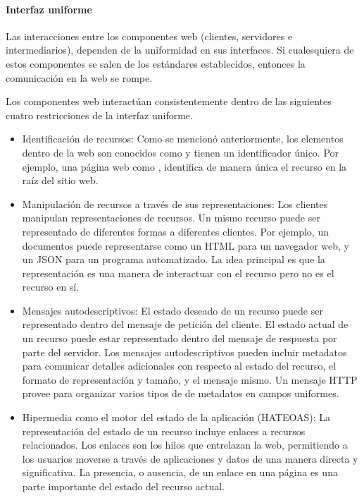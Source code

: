 \paragraph{Interfaz uniforme}
\label{\detokenize{chapter_one/rest:interfaz-uniforme}}
Las interacciones entre los componentes web (clientes, servidores e intermediarios),
dependen de la uniformidad en sus interfaces. Si cualesquiera de estos componentes se
salen de los estándares establecidos, entonces la comunicación en la web
se rompe.

Los componentes web interactúan consistentemente dentro de las siguientes
cuatro restricciones de la interfaz uniforme.

\begin{itemize}
    \item 
    Identificación de recursos:
Como se mencionó anteriormente, los elementos dentro de la web son
conocidos como  y tienen un identificador único. Por ejemplo, una
página web como , identifica de manera única el
recurso en la raíz del sitio web.


\item Manipulación de recursos a través de sus representaciones:
Los clientes manipulan representaciones de recursos. Un mismo
recurso puede ser representado de diferentes formas a diferentes
clientes. Por ejemplo, un documentos puede representarse como un HTML
para un navegador web, y un JSON para un programa automatizado. La idea
principal es que la representación es una manera de interactuar con el recurso
pero no es el recurso en sí.


\item Mensajes autodescriptivos:
El estado deseado de un recurso puede ser representado dentro del mensaje
de petición del cliente. El estado actual de un recurso puede estar representado
dentro del mensaje de respuesta por parte del servidor.
Los mensajes autodescriptivos pueden incluir metadatos para comunicar
detalles adicionales con respecto al estado del recurso, el formato
de representación y tamaño, y el mensaje mismo.
Un mensaje HTTP provee  para organizar varios tipos de
de metadatos en campos uniformes.


\item Hipermedia como el motor del estado de la aplicación (HATEOAS):
La representación del estado de un recurso incluye enlaces a recursos
relacionados. Los enlaces son los hilos que entrelazan la web, permitiendo
a los usuarios moverse a través de aplicaciones y datos de una manera directa
y significativa. La presencia, o ausencia, de un enlace en una página es una
parte importante del estado del recurso actual.


\end{itemize}

